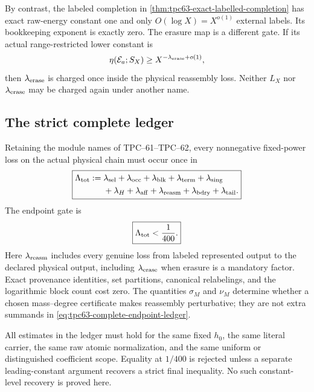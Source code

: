 By contrast, the labeled completion in
\cref{thm:tpc63-exact-labelled-completion} has exact raw-energy constant
one and only \(O(\log X)=X^{o(1)}\) external labels.  Its bookkeeping
exponent is exactly zero.  The erasure map is a different gate.  If its
actual range-restricted lower constant is
\begin{equation}
 \eta(\mathcal E_a;S_X)
 \ge X^{-\lambda_{\rm erase}+o(1)},
 \label{eq:tpc63-erasure-loss-input}
\end{equation}
then \(\lambda_{\rm erase}\) is charged once inside the physical
reassembly loss.  Neither \(L_X\) nor
\(\lambda_{\rm erase}\) may be charged again under another name.

\subsection{The strict complete ledger}

Retaining the module names of TPC--61--TPC--62, every nonnegative
fixed-power loss on the actual physical chain must occur once in
\begin{equation}
 \boxed{
 \begin{aligned}
 \Lambda_{\rm tot}:={}&
 \lambda_{\rm sel}+\lambda_{\rm occ}
 +\lambda_{\rm blk}+\lambda_{\rm term}
 +\lambda_{\rm sing}\\
 &+\lambda_H+\lambda_{\rm aff}
 +\lambda_{\rm reasm}
 +\lambda_{\rm bdry}+\lambda_{\rm tail}.
 \end{aligned}}
 \label{eq:tpc63-complete-endpoint-ledger}
\end{equation}
The endpoint gate is
\begin{equation}
 \boxed{\Lambda_{\rm tot}<\frac1{400}.}
 \label{eq:tpc63-strict-endpoint-budget}
\end{equation}
Here \(\lambda_{\rm reasm}\) includes every genuine loss from labeled
represented output to the declared physical output, including
\(\lambda_{\rm erase}\) when erasure is a mandatory factor.  Exact
provenance identities, set partitions, canonical relabelings, and the
logarithmic block count cost zero.  The quantities \(\sigma_M\) and
\(\nu_M\) determine whether a chosen mass--degree certificate makes
reassembly perturbative; they are not extra summands in
\eqref{eq:tpc63-complete-endpoint-ledger}.

All estimates in the ledger must hold for the same fixed \(h_0\), the same
literal carrier, the same raw atomic normalization, and the same uniform
or distinguished coefficient scope.  Equality at \(1/400\) is rejected
unless a separate leading-constant argument recovers a strict final
inequality.  No such constant-level recovery is proved here.

